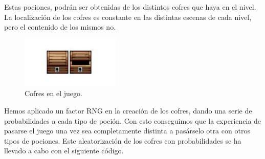 \newline
Estas pociones, podrán ser obtenidas de los distintos cofres que haya en el nivel. La localización de los cofres es constante en las distintas escenas de cada nivel, pero el contenido de los mismos no.
\begin{figure}[!htb]
  \centering
    \includegraphics{./img/1.JPG}
    \caption{Cofres en el juego.}
  \label{fig:yo}
\end{figure}
\newline
Hemos aplicado un factor RNG en la creación de los cofres, dando una serie de probabilidades a cada tipo de poción. Con esto conseguimos que la experiencia de pasarse el juego una vez sea completamente distinta a pasárselo otra con otros tipos de pociones. Este aleatorización de los cofres con probabilidades se ha llevado a cabo con el siguiente código.
\newpage

